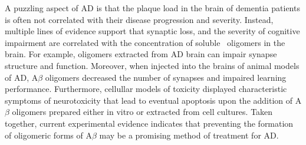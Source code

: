 A puzzling aspect of AD is that the plaque load in the brain of dementia patients is often not correlated with their disease progression and severity. Instead, multiple lines of evidence support that synaptic loss, and the severity of cognitive impairment are correlated with the concentration of soluble \abeta\ oligomers in the brain.\cite{Wang:1999fx,McLean:1999ud,Lue:1999vx} For example, oligomers extracted from AD brain can impair synapse structure and function.\cite{Shankar:2008bg}
 Moreover, when injected into the brains of animal models of AD, A$\beta$ oligomers decreased the number of synapses and impaired learning performance.\cite{Lesne:2006gx,Cleary:2005kt,Martins:2007bz,Tam:2012vz} Furthermore, cellullar models of toxicity displayed characteristic symptoms of neurotoxicity that lead to eventual apoptosis upon the addition of A$\beta$ oligomers prepared either in vitro or extracted from cell cultures.\cite{Cappai:2007bc,Lambert:1998ve,Walsh:2002p2566,Shankar:2008bg,Walsh:2007fu} Taken together, current experimental evidence indicates that preventing the formation of oligomeric forms of A$\beta$ may be a promising method of treatment for AD.



